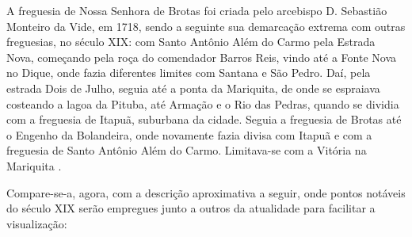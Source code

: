 \begin{citacao}
A freguesia de Nossa Senhora de Brotas foi criada pelo arcebispo D. Sebastião Monteiro da Vide, em 1718, sendo a seguinte sua demarcação extrema com outras freguesias, no século XIX: com Santo Antônio Além do Carmo pela Estrada Nova, começando pela roça do comendador Barros Reis, vindo até a Fonte Nova no Dique, onde fazia diferentes limites com Santana e São Pedro. Daí, pela estrada Dois de Julho, seguia até a ponta da Mariquita, de onde se espraiava costeando a lagoa da Pituba, até Armação e o Rio das Pedras, quando se dividia com a freguesia de Itapuã, suburbana da cidade. Seguia a freguesia de Brotas até o Engenho da Bolandeira, onde novamente fazia divisa com Itapuã e com a freguesia de Santo Antônio Além do Carmo. Limitava-se com a Vitória na Mariquita \cite[p.~58]{NASCIMENTO2007}.
\end{citacao}

Compare-se-a, agora, com a descrição aproximativa a seguir, onde pontos notáveis do século XIX serão empregues junto a outros da atualidade para facilitar a visualização:

